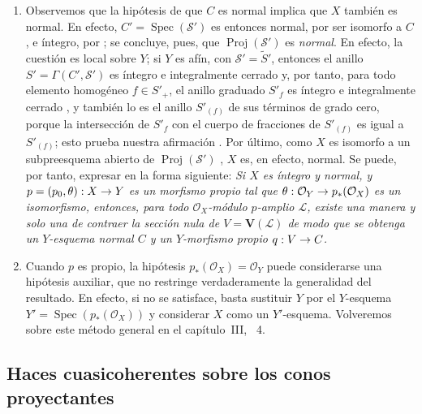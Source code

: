 \documentclass[oneside,10pt]{amsart}
\makeatletter
\newcommand{\ega@arrow}[2]{\mathchoice{#1}{#2}{#2}{#2}}
\renewcommand{\to}{\ega@arrow{\longrightarrow}{\rightarrow}}
\let\EGAOriginalLabel\label
\renewcommand{\label}[1]{\phantomsection\EGAOriginalLabel{#1}}
\makeatother
\begin{document}
\begin{remark}[8.11.8]
\label{II.8.11.8-fr}
\begin{enumerate}
    \item[\rm{(i)}] Observemos que la hipótesis de que $C$ es normal implica que $X$ también es normal.
        En efecto, $C'=\operatorname{Spec}(\mathcal{S}')$ es entonces normal, por ser isomorfo a $C$, e íntegro, por ;
        se concluye, pues, que $\operatorname{Proj}(\mathcal{S}')$ es \emph{normal}.
        En efecto, la cuestión es local sobre $Y$;
        si $Y$ es afín, con $\mathcal{S}'=\widetilde{S}'$, entonces el anillo $S'=\Gamma(C',\mathcal{S}')$ es íntegro e integralmente cerrado  y, por tanto, para todo elemento homogéneo $f\in S'_+$, el anillo graduado $S'_f$ es íntegro e integralmente cerrado \cite[t.~I, p.~257 y 261]{I-13}, y también lo es el anillo $S'_{(f)}$ de sus términos de grado cero, porque la intersección de $S'_f$ con el cuerpo de fracciones de $S'_{(f)}$ es igual a $S'_{(f)}$;
        esto prueba nuestra afirmación .
        Por último, como $X$ es isomorfo a un subpreesquema abierto de $\operatorname{Proj}(\mathcal{S}')$ , $X$ es, en efecto, normal.
        Se puede, por tanto, expresar  en la forma siguiente:
        \emph{Si $X$ es íntegro y normal, y $p=(p_0,\theta):X\to Y$ es un morfismo propio tal que $\theta:\mathcal{O}_Y\to p_*(\mathcal{O}_X)$ es un isomorfismo, entonces, para todo $\mathcal{O}_X$-módulo $p$-amplio $\mathcal{L}$, existe una manera y solo una de contraer la sección nula de $V=\mathbf{V}(\mathcal{L})$ de modo que se obtenga un $Y$-esquema normal $C$ y un $Y$-morfismo propio $q:V\to C$.}
    \item[\rm{(ii)}] Cuando $p$ es propio, la hipótesis $p_*(\mathcal{O}_X)=\mathcal{O}_Y$ puede considerarse una hipótesis auxiliar, que no restringe verdaderamente la generalidad del resultado.
        En efecto, si no se satisface, basta sustituir $Y$ por el $Y$-esquema $Y'=\operatorname{Spec}(p_*(\mathcal{O}_X))$ y considerar $X$ como un $Y'$-esquema.
        Volveremos sobre este método general en el capítulo~III, \textsection~4.
\end{enumerate}
\end{remark}


\subsection{Haces cuasicoherentes sobre los conos proyectantes}
\label{subsection:II.8.12-fr}
\end{document}
